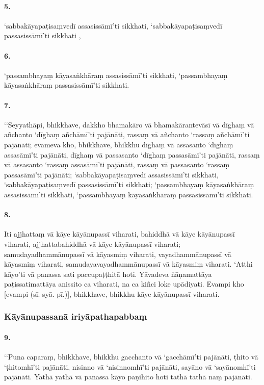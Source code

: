 \paragraph{5.} ‘sabbakāyapaṭisaṃvedī assasissāmī’ti sikkhati, ‘sabbakāyapaṭisaṃvedī passasissāmī’ti sikkhati ,

\paragraph{6.} ‘passambhayaṃ kāyasaṅkhāraṃ assasissāmī’ti sikkhati, ‘passambhayaṃ kāyasaṅkhāraṃ passasissāmī’ti sikkhati.

\paragraph{7.} ‘‘Seyyathāpi, bhikkhave, dakkho bhamakāro vā bhamakārantevāsī vā dīghaṃ vā añchanto ‘dīghaṃ añchāmī’ti pajānāti, rassaṃ vā añchanto ‘rassaṃ añchāmī’ti pajānāti; evameva kho, bhikkhave, bhikkhu dīghaṃ vā assasanto ‘dīghaṃ assasāmī’ti pajānāti, dīghaṃ vā passasanto ‘dīghaṃ passasāmī’ti pajānāti, rassaṃ vā assasanto ‘rassaṃ assasāmī’ti pajānāti, rassaṃ vā passasanto ‘rassaṃ passasāmī’ti pajānāti; ‘sabbakāyapaṭisaṃvedī assasissāmī’ti sikkhati, ‘sabbakāyapaṭisaṃvedī passasissāmī’ti sikkhati; ‘passambhayaṃ kāyasaṅkhāraṃ assasissāmī’ti sikkhati, ‘passambhayaṃ kāyasaṅkhāraṃ passasissāmī’ti sikkhati.

\paragraph{8.} Iti ajjhattaṃ vā kāye kāyānupassī viharati, bahiddhā vā kāye kāyānupassī viharati, ajjhattabahiddhā vā kāye kāyānupassī viharati; samudayadhammānupassī vā kāyasmiṃ viharati, vayadhammānupassī vā kāyasmiṃ viharati, samudayavayadhammānupassī vā kāyasmiṃ viharati. ‘Atthi kāyo’ti vā panassa sati paccupaṭṭhitā hoti. Yāvadeva ñāṇamattāya paṭissatimattāya anissito ca viharati, na ca kiñci loke upādiyati. Evampi kho [evampi (sī. syā. pī.)], bhikkhave, bhikkhu kāye kāyānupassī viharati.


\subsubsection{Kāyānupassanā iriyāpathapabbaṃ}

\paragraph{9.} ‘‘Puna caparaṃ, bhikkhave, bhikkhu gacchanto vā ‘gacchāmī’ti pajānāti, ṭhito vā ‘ṭhitomhī’ti pajānāti, nisinno vā ‘nisinnomhī’ti pajānāti, sayāno vā ‘sayānomhī’ti pajānāti. Yathā yathā vā panassa kāyo paṇihito hoti tathā tathā naṃ pajānāti.

